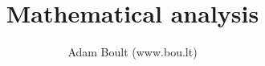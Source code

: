 \documentclass[oneside]{book}
\begin{document}
\author{Adam Boult (www.bou.lt)}
\title{Mathematical analysis}
\maketitle

\setcounter{tocdepth}{0}
\tableofcontents


\end{document}
